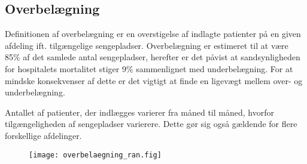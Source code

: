 \subsection{Overbelægning}
Definitionen af overbelægning er en overstigelse af indlagte patienter på en given afdeling ift. tilgængelige sengepladser. Overbelægning er estimeret til at være 85\% af det samlede antal sengepladser, herefter er det påvist at sandsynligheden for hospitalets mortalitet  stiger 9\% sammenlignet med underbelægning. \citep{dodlighed2014} For at mindske konsekvenser af dette er det vigtigt at finde en ligevægt mellem over- og underbelægning.  

\noindent
Antallet af patienter, der indlægges varierer fra måned til måned, hvorfor tilgængeligheden af sengepladser varierere. Dette gør sig også gældende for flere forskellige afdelinger. 


\begin{figure}[H]
\centering
\texttt{[image: overbelaegning\_ran.fig]}
\caption{ }
\label{Overbelaegning af patienter over hele Danmark}
\end{figure}
